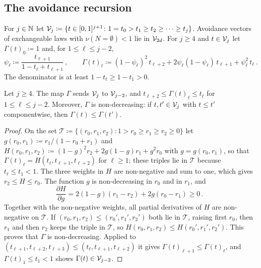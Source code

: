\documentclass[11pt,letterpaper]{article}
\begin{document}
\subsection{The avoidance recursion}

For $j\in\mathbb N$ let $\mathcal V_j\coloneqq\{t\in[0,1]^{j+1}\colon 1=t_0>t_1\ge t_2\ge\dots\ge t_j\}$. Avoidance vectors of exchangeable laws with $\nu(N=\emptyset)<1$ lie in $\mathcal V_{2d}$. For $j\ge4$ and $t\in\mathcal V_j$ let $\Gamma(t)_0\coloneqq1$ and, for $1\le\ell\le j-2$,
\begin{equation}\label{eq:Gamma}
\psi_\ell\coloneqq\frac{t_{\ell+1}}{1-t_\ell+t_{\ell+1}}\,,\qquad \Gamma(t)_\ell\coloneqq(1-\psi_\ell)^2\,t_{\ell+2}+2\psi_\ell(1-\psi_\ell)\,t_{\ell+1}+\psi_\ell^2\,t_\ell\,.
\end{equation}
The denominator is at least $1-t_\ell\ge1-t_1>0$.

\begin{lemma}\label{lem:monotone}
Let $j\ge4$. The map $\Gamma$ sends $\mathcal V_j$ to $\mathcal V_{j-2}$, and $t_{\ell+2}\le\Gamma(t)_\ell\le t_\ell$ for $1\le\ell\le j-2$. Moreover, $\Gamma$ is non-decreasing: if $t,t'\in\mathcal V_j$ with $t\le t'$ componentwise, then $\Gamma(t)\le\Gamma(t')$.
\end{lemma}

\begin{proof}
On the set $\mathcal T\coloneqq\{(r_0,r_1,r_2)\colon1>r_0\ge r_1\ge r_2\ge0\}$ let $g(r_0,r_1)\coloneqq r_1/(1-r_0+r_1)$ and $H(r_0,r_1,r_2)\coloneqq(1-g)^2r_2+2g(1-g)r_1+g^2r_0$ with $g=g(r_0,r_1)$, so that $\Gamma(t)_\ell=H(t_\ell,t_{\ell+1},t_{\ell+2})$ for $\ell\ge1$; these triples lie in $\mathcal T$ because $t_\ell\le t_1<1$. The three weights in $H$ are non-negative and sum to one, which gives $r_2\le H\le r_0$. The function $g$ is non-decreasing in $r_0$ and in $r_1$, and
\begin{equation*}
\frac{\partial H}{\partial g}=2(1-g)(r_1-r_2)+2g(r_0-r_1)\ge0\,.
\end{equation*}
Together with the non-negative weights, all partial derivatives of $H$ are non-negative on $\mathcal T$. If $(r_0,r_1,r_2)\le(r_0',r_1',r_2')$ both lie in $\mathcal T$, raising first $r_0$, then $r_1$ and then $r_2$ keeps the triple in $\mathcal T$, so $H(r_0,r_1,r_2)\le H(r_0',r_1',r_2')$. This proves that $\Gamma$ is non-decreasing. Applied to $(t_{\ell+1},t_{\ell+2},t_{\ell+3})\le(t_\ell,t_{\ell+1},t_{\ell+2})$ it gives $\Gamma(t)_{\ell+1}\le\Gamma(t)_\ell$, and $\Gamma(t)_1\le t_1<1$ shows $\Gamma(t)\in\mathcal V_{j-2}$.
\end{proof}
\end{document}
